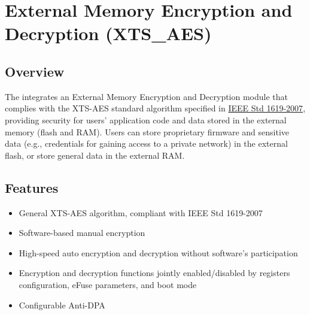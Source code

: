 \documentclass[main\_\_EN.tex]{subfiles}
\begin{document}

\ifglobal
\else
    {\let\clearpage\relax \listoftodos}
    {\let\clearpage\relax \listofdonetodos}
    \tableofcontents
\fi



\hypertarget{extmemencr}{}
\chapter{External Memory Encryption and Decryption (XTS\_AES)}
\label{mod:extmemencr}

\section{Overview}

The \chipname{} integrates an External Memory Encryption and Decryption module that complies with the XTS-AES standard algorithm specified in \href{https://ieeexplore.ieee.org/document/4493450}{IEEE Std 1619-2007}, providing security for users' application code and data stored in the external memory (flash and RAM). Users can store proprietary firmware and sensitive data (e.g., credentials for gaining access to a private network) in the external flash, or store general data in the external RAM.


\section{Features}

\begin{itemize}
    \item General XTS-AES algorithm, compliant with IEEE Std 1619-2007
    \item Software-based manual encryption
    \item High-speed auto encryption and decryption without software's participation
    \item Encryption and decryption functions jointly enabled/disabled by registers configuration, eFuse parameters, and boot mode
    \item Configurable Anti-DPA
\end{itemize}
\end{document}
